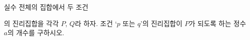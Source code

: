 실수 전체의 집합에서 두 조건\par\smallskip{}\par\smallskip\noindent 의 진리집합을 각각 $P$, $Q$라 하자. 조건 ‘$p$ 또는 $q$’의 진리집합이 $P$가 되도록 하는 정수 $a$의 개수를 구하시오.
